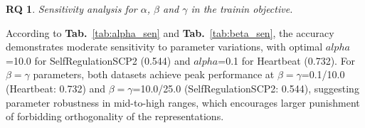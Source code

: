 \documentclass{article}
\newtheorem{researchq}{RQ}
\begin{document}
\begin{researchq}
Sensitivity analysis for $\alpha$, $\beta$ and $\gamma$ in the trainin objective.
\end{researchq}

According to \textbf{Tab.}~\ref{tab:alpha_sen} and \textbf{Tab.}~\ref{tab:beta_sen}, the accuracy demonstrates moderate sensitivity to parameter variations, with optimal $alpha$=10.0 for SelfRegulationSCP2 (0.544) and $alpha$=0.1 for Heartbeat (0.732).  For $\beta=\gamma$ parameters, both datasets achieve peak performance at $\beta=\gamma$=0.1/10.0 (Heartbeat: 0.732) and $\beta=\gamma$=10.0/25.0 (SelfRegulationSCP2: 0.544), suggesting parameter robustness in mid-to-high ranges, which encourages larger punishment of forbidding orthogonality of the representations.

\begin{table}[htbp]\label{tab:alpha_sen}
    \centering
    \caption{Accuracy comparison with different $\alpha$ values.}
    \label{tab:results}
\end{table}

\begin{table}[htbp]\label{tab:beta_sen}
    \centering
    \caption{Accuracy comparison with different $\beta=\gamma$ values.}
    \label{tab:beta_results}
\end{table}




\end{document}
